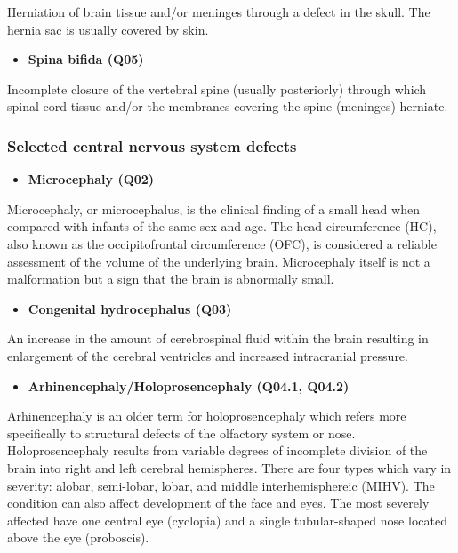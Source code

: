 \documentclass[
]{krantz}
\providecommand{\tightlist}{%
  \setlength{\itemsep}{0pt}\setlength{\parskip}{0pt}}
\begin{document}
Herniation of brain tissue and/or meninges through a defect in the skull. The hernia sac is usually covered by skin.

\begin{itemize}
\tightlist
\item
  \textbf{Spina bifida (Q05)}
\end{itemize}

Incomplete closure of the vertebral spine (usually posteriorly) through which spinal cord tissue and/or the membranes covering the spine (meninges) herniate.

\hypertarget{section2112}{%
\subsubsection{Selected central nervous system defects}\label{section2112}}

\begin{itemize}
\tightlist
\item
  \textbf{Microcephaly (Q02)}
\end{itemize}

Microcephaly, or microcephalus, is the clinical finding of a small head when compared with infants of the same sex and age. The head circumference (HC), also known as the occipitofrontal circumference (OFC), is considered a reliable assessment of the volume of the underlying brain. Microcephaly itself is not a malformation but a sign that the brain is abnormally small.

\begin{itemize}
\tightlist
\item
  \textbf{Congenital hydrocephalus (Q03)}
\end{itemize}

An increase in the amount of cerebrospinal fluid within the brain resulting in enlargement of the cerebral ventricles and increased intracranial pressure.

\begin{itemize}
\tightlist
\item
  \textbf{Arhinencephaly/Holoprosencephaly (Q04.1, Q04.2)}
\end{itemize}

Arhinencephaly is an older term for holoprosencephaly which refers more specifically to structural defects of the olfactory system or nose. Holoprosencephaly results from variable degrees of incomplete division of the brain into right and left cerebral hemispheres. There are four types which vary in severity: alobar, semi-lobar, lobar, and middle interhemisphereic (MIHV). The condition can also affect development of the face and eyes. The most severely affected have one central eye (cyclopia) and a single tubular-shaped nose located above the eye (proboscis).
\end{document}
